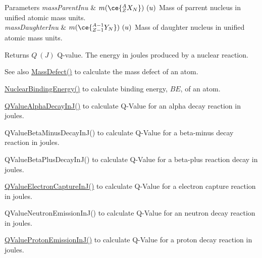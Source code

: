 \begin{DoxyParams}{Parameters}
{\em mass\+Parent\+Inu} & $m(\ce{ ^{A}_{Z}X_{N} })\ (u)$ Mass of parrent nucleus in unified atomic mass units. \\
\hline
{\em mass\+Daughter\+Inu} & $m(\ce{ ^{A-1}_{Z-1}Y_{N} })\ (u)$ Mass of daughter nucleus in unified atomic mass units. \\
\hline
\end{DoxyParams}
\begin{DoxyReturn}{Returns}
$Q\ (J)$ Q-\/value. The energy in joules produced by a nuclear reaction. 
\end{DoxyReturn}
\begin{DoxySeeAlso}{See also}
\mbox{\hyperlink{group___e_g_x_phys-_mass_defect_gae89f2dfa65992c0314adc2440b2f582a}{Mass\+Defect()}} to calculate the mass defect of an atom. 

\mbox{\hyperlink{group___e_g_x_phys-_nuclear_binding_energy_gab6832bf15ead7b4e867e759e0a2a078e}{Nuclear\+Binding\+Energy()}} to calculate binding energy, $BE$, of an atom. 

\mbox{\hyperlink{group___e_g_x_phys-_q_value-_alpha_gab8a50c18f6de3c1b6ed280c26c3ff3a5}{Q\+Value\+Alpha\+Decay\+In\+J()}} to calculate Q-\/\+Value for an alpha decay reaction in joules. 

Q\+Value\+Beta\+Minus\+Decay\+In\+J() to calculate Q-\/\+Value for a beta-\/minus decay reaction in joules. 

Q\+Value\+Beta\+Plus\+Decay\+In\+J() to calculate Q-\/\+Value for a beta-\/plus reaction decay in joules. 

\mbox{\hyperlink{group___e_g_x_phys-_q_value-_electron_capture_gaf2569f9c706130b730dcf55695780263}{Q\+Value\+Electron\+Capture\+In\+J()}} to calculate Q-\/\+Value for a electron capture reaction in joules. 

Q\+Value\+Neutron\+Emission\+In\+J() to calculate Q-\/\+Value for an neutron decay reaction in joules. 

\mbox{\hyperlink{group___e_g_x_phys-_q_value-_proton_ga41f19b0d9a2dc06e89de44aaa2d48d62}{Q\+Value\+Proton\+Emission\+In\+J()}} to calculate Q-\/\+Value for a proton decay reaction in joules. 
\end{DoxySeeAlso}
\mbox{\label{group___e_g_x_phys-_q_value-_proton_ga5d92756e945e66bd2ed7d55145b95c3b}} 

